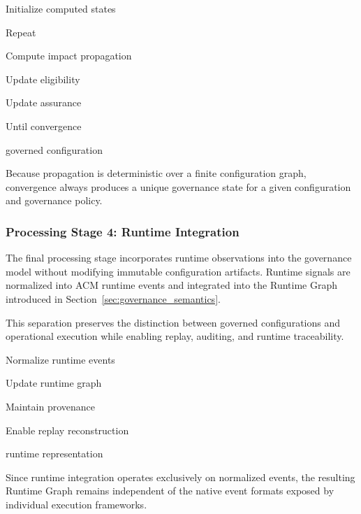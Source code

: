 \documentclass[10pt]{article}
\begin{document}
\begin{algorithm}[ht]
\caption{Governance State Computation}

Initialize computed states\;

Repeat

\Indp

Compute impact propagation\;

Update eligibility\;

Update assurance\;

\Indm

Until convergence\;

\Return governed configuration\;

\end{algorithm}

Because propagation is deterministic over a finite configuration graph, convergence always produces a unique governance state for a given configuration and governance policy.

\subsubsection{Processing Stage 4: Runtime Integration}

The final processing stage incorporates runtime observations into the governance model without modifying immutable configuration artifacts. Runtime signals are normalized into ACM runtime events and integrated into the Runtime Graph introduced in Section~\ref{sec:governance_semantics}.

This separation preserves the distinction between governed configurations and operational execution while enabling replay, auditing, and runtime traceability.

\begin{algorithm}[ht]
\caption{Runtime Integration}

Normalize runtime events\;

Update runtime graph\;

Maintain provenance\;

Enable replay reconstruction\;

\Return runtime representation\;

\end{algorithm}

Since runtime integration operates exclusively on normalized events, the resulting Runtime Graph remains independent of the native event formats exposed by individual execution frameworks.
\end{document}
